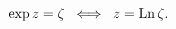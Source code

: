 \[\mathop{\exp\/}\nolimits z=\zeta\;\;\Longleftrightarrow\;\;z=\mathop{\mathrm{%
Ln}\/}\nolimits\zeta.\]